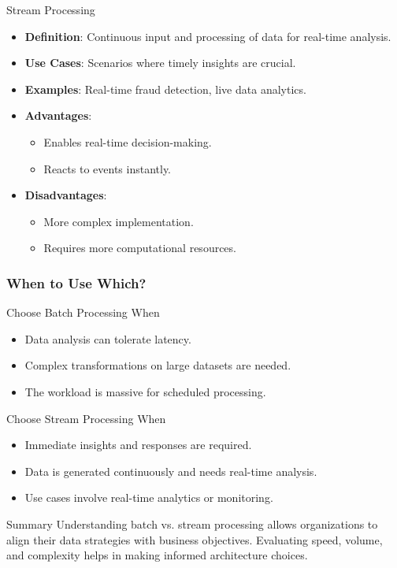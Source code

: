\documentclass[aspectratio=169]{beamer}
\begin{document}
\begin{frame}[fragile]
    \begin{block}{Stream Processing}
        \begin{itemize}
            \item \textbf{Definition}: Continuous input and processing of data for real-time analysis.
            \item \textbf{Use Cases}: Scenarios where timely insights are crucial.
            \item \textbf{Examples}: Real-time fraud detection, live data analytics.
            \item \textbf{Advantages}:
            \begin{itemize}
                \item Enables real-time decision-making.
                \item Reacts to events instantly.
            \end{itemize}
            \item \textbf{Disadvantages}:
            \begin{itemize}
                \item More complex implementation.
                \item Requires more computational resources.
            \end{itemize}
        \end{itemize}
    \end{block}
\end{frame}

\begin{frame}[fragile]
    \frametitle{When to Use Which?}
    \begin{block}{Choose Batch Processing When}
        \begin{itemize}
            \item Data analysis can tolerate latency.
            \item Complex transformations on large datasets are needed.
            \item The workload is massive for scheduled processing.
        \end{itemize}
    \end{block}

    \begin{block}{Choose Stream Processing When}
        \begin{itemize}
            \item Immediate insights and responses are required.
            \item Data is generated continuously and needs real-time analysis.
            \item Use cases involve real-time analytics or monitoring.
        \end{itemize}
    \end{block}

    \begin{block}{Summary}
        Understanding batch vs. stream processing allows organizations to align their data strategies with business objectives. Evaluating speed, volume, and complexity helps in making informed architecture choices.
    \end{block}
\end{frame}
\end{document}

